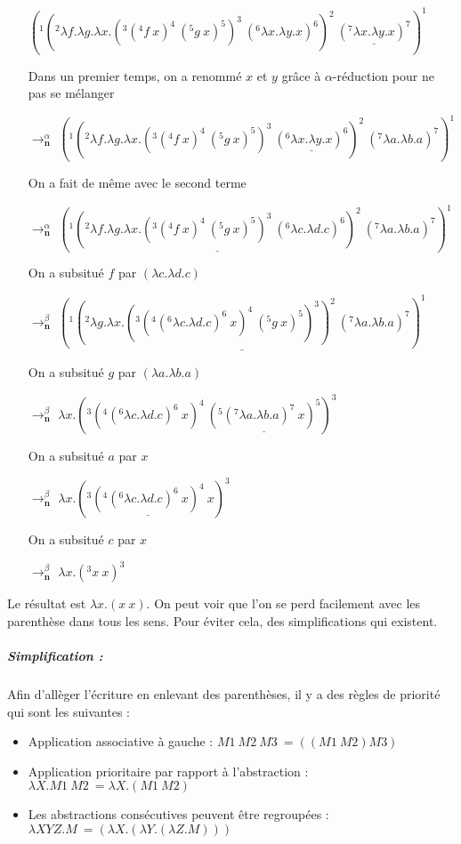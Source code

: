 \documentclass[10pt,a4paper]{report}
\begin{document}
\begin{itemize}
\item[] $(^{1}(^{2}\lambda f.\lambda g.\lambda x.(^{3}(^{4}f~x)^{4}~(^{5}g~x)^{5})^{3}~(^{6}\lambda x.\lambda y.x)^{6})^{2}~\underline{(^{7}\lambda x.\lambda y.x)^{7}})^{1}$
\item[] Dans un premier temps, on a renommé $x$ et $y$ grâce à $\alpha$-réduction pour ne pas se mélanger
\item[$\rightarrow^{\alpha}_{\textbf{n}}$] $(^{1}(^{2}\lambda f.\lambda g.\lambda x.(^{3}(^{4}f~x)^{4}~(^{5}g~x)^{5})^{3}~\underline{(^{6}\lambda x.\lambda y.x)^{6}})^{2}~(^{7}\lambda a.\lambda b.a)^{7})^{1}$
  
\item[] On a fait de même avec le second terme
\item[$\rightarrow^{\alpha}_{\textbf{n}}$] $(^{1}\underline{(^{2}\lambda f.\lambda g.\lambda x.(^{3}(^{4}f~x)^{4}~(^{5}g~x)^{5})^{3}~(^{6}\lambda c.\lambda d.c)^{6})^{2}}~(^{7}\lambda a.\lambda b.a)^{7})^{1}$
  
\item[] On a subsitué $f$ par $(\lambda c.\lambda d.c)$
\item[$\rightarrow^{\beta}_{\textbf{n}}$] $\underline{(^{1}(^{2}\lambda g.\lambda x.(^{3}(^{4}(^{6}\lambda c.\lambda d.c)^{6}~x)^{4}~(^{5}g~x)^{5})^{3})^{2}~(^{7}\lambda a.\lambda b.a)^{7})^{1}}$
  
\item[] On a subsitué $g$ par $(\lambda a.\lambda b.a)$
\item[$\rightarrow^{\beta}_{\textbf{n}}$] $\lambda x.(^{3}(^{4}(^{6}\lambda c.\lambda d.c)^{6}~x)^{4}~\underline{(^{5}(^{7}\lambda a.\lambda b.a)^{7}~x)^{5}})^{3}$
  
\item[] On a subsitué $a$ par $x$
\item[$\rightarrow^{\beta}_{\textbf{n}}$] $\lambda x.(^{3}\underline{(^{4}(^{6}\lambda c.\lambda d.c)^{6}~x)^{4}}~x)^{3}$
  
\item[] On a subsitué $c$ par $x$
\item[$\rightarrow^{\beta}_{\textbf{n}}$] $\lambda x.(^{3}x~x)^{3}$
\end{itemize}
\bigbreak

Le résultat est $\lambda x.(x~x)$. On peut voir que l'on se perd facilement avec les parenthèse dans tous les sens. Pour éviter cela, des simplifications qui existent.

\subparagraph{Simplification :} Afin d'allèger l'écriture en enlevant des parenthèses, il y a des règles de priorité qui sont les suivantes :
\begin{itemize}
\item Application associative à gauche : $M1~M2~M3~= ((M1~M2)M3)$
\item Application prioritaire par rapport à l'abstraction : $\lambda X.M1~M2~= \lambda X.(M1~M2)$
\item Les abstractions consécutives peuvent être regroupées : $\lambda XYZ.M~= (\lambda X.(\lambda Y.(\lambda Z.M)))$
\end{itemize}
\medbreak
\end{document}
